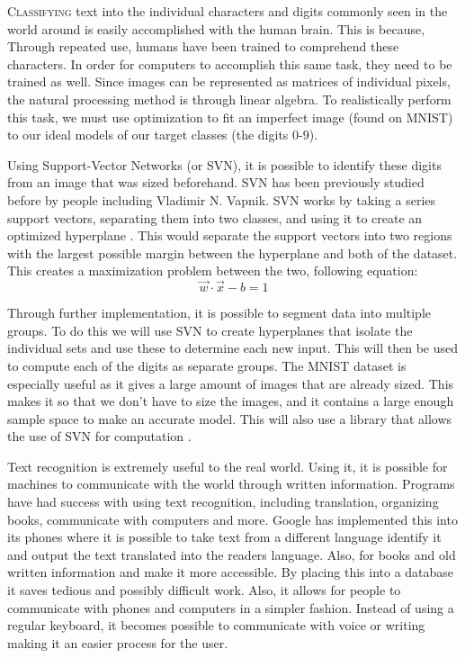 \lettrine[nindent=0em,lines=3]{C}{lassifying} text into the individual characters and digits commonly seen in the world around is easily accomplished with the human brain. This is because, Through repeated use, humans have been trained to comprehend these characters. In order for computers to accomplish this same task, they need to be trained as well. Since images can be represented as matrices of individual pixels, the natural processing method is through linear algebra. To realistically perform this task, we must use optimization to fit an imperfect image (found on MNIST) to our ideal models of our target classes (the digits 0-9).

Using Support-Vector Networks (or SVN), it is possible to identify these digits from an image that was sized beforehand. SVN has been previously studied before by people including Vladimir N. Vapnik. SVN works by taking a series support vectors, separating them into two classes, and using it to create an optimized hyperplane \cite{statistical-learning}. This would separate the support vectors into two regions with the largest possible margin between the hyperplane and both of the dataset. This creates a maximization problem between the two, following equation:
\begin{equation}
  \vec{w} \cdot \vec{x}-b=1
\end{equation}

Through further implementation, it is possible to segment data into multiple groups. To do this we will use SVN to create hyperplanes that isolate the individual sets and use these to determine each new input. This will then be used to compute each of the digits as separate groups.  The MNIST dataset is especially useful as it gives a large amount of images that are already sized. This makes it so that we don't have to size the images, and it contains a large enough sample space to make an accurate model. This will also use a library that allows the use of SVN for computation \cite{scikit-learn}.

Text recognition is extremely useful to the real world. Using it, it is possible for machines to communicate with the world through written information. Programs have had success with using text recognition, including translation, organizing books, communicate with computers and more. Google has implemented this into its phones where it is possible to take text from a different language identify it and output the text translated into the readers language. Also, for books and old written information and make it more accessible. By placing this into a database it saves tedious and possibly difficult work. Also, it allows for people to communicate with phones and computers in a simpler fashion. Instead of using a regular keyboard, it becomes possible to communicate with voice or writing making it an easier process for the user.